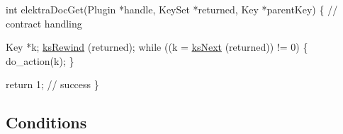 \begin{DoxyCode}
\textcolor{keywordtype}{int} elektraDocGet(Plugin *handle, KeySet *returned, Key *parentKey)
\{
        \textcolor{comment}{// contract handling}

        Key *k;
        \hyperlink{group__keyset_gabe793ff51f1728e3429c84a8a9086b70}{ksRewind} (returned);
        \textcolor{keywordflow}{while} ((k = \hyperlink{group__keyset_ga317321c9065b5a4b3e33fe1c399bcec9}{ksNext} (returned)) != 0)
        \{
                do\_action(k);
        \}

        \textcolor{keywordflow}{return} 1; \textcolor{comment}{// success}
\}
\end{DoxyCode}
\hypertarget{group__plugin_conditions}{}\subsection{Conditions}\label{group__plugin_conditions}
